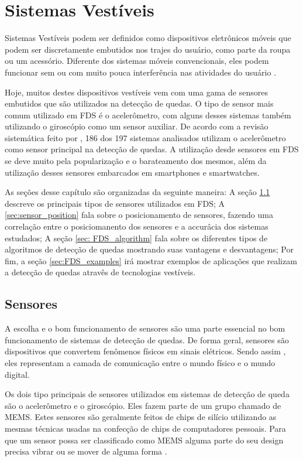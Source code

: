 \chapter{Sistemas Vestíveis} 
\label{cap:wearablw_systems}

Sistemas Vestíveis podem ser definidos como dispositivos eletrônicos móveis que podem ser discretamente embutidos nos trajes do usuário, como parte da roupa ou um acessório. Diferente dos sistemas móveis convencionais, eles podem funcionar sem ou com muito pouca interferência nas atividades do usuário \citep{lukowicz2004wearable}. 

Hoje, muitos destes dispositivos vestíveis vem com uma gama de sensores embutidos que são utilizados na detecção de quedas. O tipo de sensor mais comum utilizado em \ac{FDS} é o acelerômetro, com alguns desses sistemas também utilizando o giroscópio como um sensor auxiliar. De acordo com a revisão sistemática feito por \cite{igual2013challenges}, 186 dos 197 sistemas analisados utilizam o acelerômetro como sensor principal na detecção de quedas. A utilização desde sensores em \ac{FDS} se deve muito pela popularização e o barateamento dos mesmos, além da utilização desses sensores embarcados em smartphones e smartwatches.


As seções desse capítulo são organizadas da seguinte maneira: A seção \ref{sec:sensors} descreve os principais tipos de sensores utilizados em \ac{FDS}; A \ref{sec:sensor_position} fala sobre o posicionamento de sensores, fazendo uma correlação entre o posiciomanento dos sensores e a accurâcia dos sistemas estudados; A seção \ref{sec: FDS_algorithm} fala sobre os diferentes tipos de algoritmos de detecção de quedas mostrando suas vantagens e desvantagens; Por fim, a seção \ref{sec:FDS_examples} irá mostrar exemplos de aplicações que realizam a detecção de quedas atravês de tecnologias vestíveis. 



\section{Sensores}
\label{sec:sensors}
A escolha e o bom funcionamento de sensores são uma parte essencial no bom funcionamento de sistemas de detecção de quedas. De forma geral, sensores são dispositivos que convertem fenômenos físicos em sinais elétricos. Sendo assim , eles representam a camada de comunicação entre o mundo físico e o mundo digital. 

Os dois tipo principais de sensores utilizados em sistemas de detecção de queda são o acelerômetro e o giroscópio. Eles fazem parte de um grupo chamado de \ac{MEMS}. Estes sensores são geralmente feitos de chips de silício utilizando as mesmas técnicas usadas na confecção de chips de computadores pessoais. Para que um sensor possa ser classificado como \ac{MEMS} alguma parte do seu design precisa vibrar ou se mover de alguma forma \citep{milette2012professional}. 

